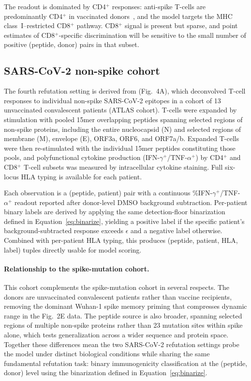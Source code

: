 \documentclass[11pt]{article}
\begin{document}
The readout is dominated by CD4$^+$ responses: anti-spike T-cells
are predominantly CD4$^+$ in vaccinated donors~\citep{cimenbozkus2025},
and the model targets the MHC class~I--restricted CD8$^+$ pathway.
CD8$^+$ signal is present but sparse, and point estimates of
CD8$^+$-specific discrimination will be sensitive to the small number
of positive (peptide, donor) pairs in that subset.
\subsection{SARS-CoV-2 non-spike cohort}

The fourth refutation setting is derived from \citet{cimenbozkus2025} (Fig.~4A),
which deconvolved T-cell responses to individual non-spike SARS-CoV-2
epitopes in a cohort of 13 unvaccinated convalescent patients (ATLAS
cohort). T-cells were expanded by stimulation with pooled 15mer
overlapping peptides spanning selected regions of non-spike proteins,
including the entire nucleocapsid (N) and selected regions of membrane
(M), envelope (E), ORF3a, ORF6, and ORF7a/b. Expanded T-cells were
then re-stimulated with the individual 15mer peptides constituting
those pools, and polyfunctional cytokine production
(IFN-$\gamma^+$/TNF-$\alpha^+$) by CD4$^+$ and CD8$^+$ T-cell subsets
was measured by intracellular cytokine staining. Full six-locus HLA
typing is available for each patient.

Each observation is a (peptide, patient) pair with a continuous
\%IFN-$\gamma^+$/TNF-$\alpha^+$ readout reported after donor-level
DMSO background subtraction. Per-patient binary labels are derived
by applying the same detection-floor binarization defined in
Equation~\ref{eq:binarize}, yielding a positive label if the
specific patient's background-subtracted response exceeds $\epsilon$
and a negative label otherwise. Combined with per-patient HLA typing,
this produces (peptide, patient, HLA, label) tuples directly usable
for model scoring.

\paragraph{Relationship to the spike-mutation cohort.}

This cohort complements the spike-mutation cohort in several respects.
The donors are unvaccinated convalescent patients rather than vaccine
recipients, removing the dominant Wuhan-1 spike memory priming that
compresses dynamic range in the Fig.~2E data. The peptide source is
also broader, spanning selected regions of multiple non-spike proteins
rather than 23 mutation sites within spike alone, which tests
generalization across a wider sequence and protein space. Together
these differences mean the two SARS-CoV-2 refutation settings probe the model under
distinct biological conditions while sharing the same fundamental
refutation task: binary immunogenicity classification at the
(peptide, donor) level using the binarization defined in
Equation~\ref{eq:binarize}.
\end{document}
